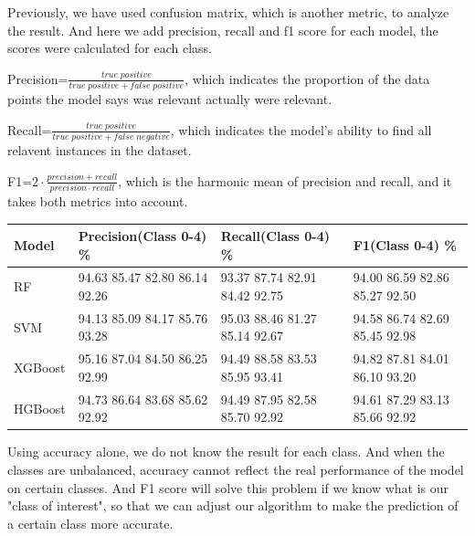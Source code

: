 \documentclass[12pt]{article}
\begin{document}
Previously, we have used confusion matrix, which is another metric, to analyze the result. And here we add precision, recall and f1 score for each model, the scores were calculated for each class. 

Precision=$\frac{true\;positive}{true\;positive+false\;positive}$, which indicates the proportion of the data points the model says was relevant actually were relevant.

Recall=$\frac{true\;positive}{true\;positive+false\;negative}$, which indicates the model's ability to find all relavent instances in the dataset.

F1=$2\cdot\frac{precision+recall}{precision\cdot recall}$, which is the harmonic mean of precision and recall, and it takes both metrics into account.

\begin{center}
\small
\begin{tabular}{|p{1.5cm}|p{4.8cm}|p{4.8cm}|p{4.8cm}|}
\hline
\textbf{Model} & \textbf{Precision(Class 0-4) \%} & \textbf{Recall(Class 0-4) \%} & \textbf{F1(Class 0-4) \%}\\ 
\hline
RF & 94.63 85.47 82.80  86.14 92.26 & 93.37 87.74 82.91 84.42 92.75 & 94.00 86.59 82.86 85.27 92.50\\ 
\hline
SVM & 94.13 85.09 84.17 85.76 93.28 & 95.03 88.46 81.27 85.14 92.67 & 94.58 86.74 82.69 85.45 92.98\\ 
\hline
XGBoost & 95.16 87.04 84.50 86.25 92.99 & 94.49 88.58 83.53 85.95 93.41 & 94.82 87.81 84.01 86.10 93.20\\ 
\hline
HGBoost & 94.73 86.64 83.68 85.62 92.92 & 94.49 87.95 82.58 85.70 92.92 & 94.61 87.29 83.13 85.66 92.92\\
\hline
\end{tabular}
\end{center}

Using accuracy alone, we do not know the result for each class. And when the classes are unbalanced, accuracy cannot reflect the real performance of the model on certain classes. And F1 score will solve this problem if we know what is our "class of interest", so that we can adjust our algorithm to make the prediction of a certain class more accurate.
\end{document}
